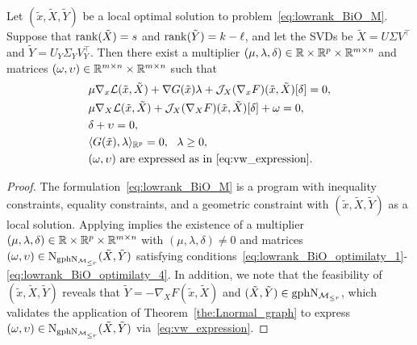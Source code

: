 \begin{proposition}\label{pro:M-stationary}
    Let $(\tilde{x},\tilde{X},\tilde{Y})$ be a local optimal solution to problem~\eqref{eq:lowrank_BiO_M}. Suppose that $\operatorname{rank}(\tilde{X})=s$ and $\operatorname{rank}(\tilde{Y})=k-\ell$, and let the SVDs be $\tilde{X}=U\varSigma V^\top$ and $\tilde{Y}=U_Y\varSigma_YV_Y^\top$. Then there exist a multiplier $(\mu,\lambda,\delta)\in\mathbb{R}\times\mathbb{R}^{p}\times\mathbb{R}^{m\times n}$ and matrices $(\omega,\upsilon)\in\mathbb{R}^{m\times n}\times\mathbb{R}^{m\times n}$ such that
    \begin{align}
        &\mu\nabla_x\mathcal{L}(\tilde{x},\tilde{X})+\nabla G(\tilde{x})\lambda+\mathcal{J}_X(\nabla_xF)(\tilde{x},\tilde{X})[\delta] = 0,  \label{eq:lowrank_BiO_optimilaty_1}
        \\
        &\mu\nabla_X\mathcal{L}(\tilde{x},\tilde{X})+\mathcal{J}_X (\nabla_X F)(\tilde{x},\tilde{X})[\delta] + \omega = 0,     \label{eq:lowrank_BiO_optimilaty_2}
        \\
        &\delta+\upsilon = 0,   \label{eq:lowrank_BiO_optimilaty_3}
        \\
        & \langle {G(\tilde{x}),\lambda} \rangle_{\mathbb{R}^p}= 0,\ \ \lambda\ge 0,   \label{eq:lowrank_BiO_optimilaty_4}
        \\
        &(\omega,\upsilon)\ \text{are expressed as in~\eqref{eq:vw_expression}}.    \nonumber
    \end{align}
\end{proposition}
\begin{proof}
    The formulation~\eqref{eq:lowrank_BiO_M} is a program with inequality constraints, equality constraints, and a geometric constraint with $(\tilde{x},\tilde{X},\tilde{Y})$ as a local solution. Applying \cite[Theorem 5.21]{mordukhovich2006variationalII} implies the existence of a multiplier $(\mu,\lambda,\delta)\in\mathbb{R}\times\mathbb{R}^{p}\times\mathbb{R}^{m\times n}$ with $(\mu,\lambda,\delta)\neq 0$ and matrices $(\omega,\upsilon)\in\mathrm{N}_{\mathrm{gph}\mathrm{N}_{\mathcal{M}_{\le r}}}(\tilde{X},\tilde{Y})$ satisfying conditions~\eqref{eq:lowrank_BiO_optimilaty_1}-\eqref{eq:lowrank_BiO_optimilaty_4}. In addition, we note that the feasibility of $(\tilde{x},\tilde{X},\tilde{Y})$ reveals that $\tilde{Y}=-\nabla_X F(\tilde{x},\tilde{X})$ and $(\tilde{X},\tilde{Y})\in\mathrm{gph} \mathrm{N}_{\mathcal{M}_{\le r}}$, which validates the application of Theorem~\ref{the:Lnormal_graph} to express $(\omega,\upsilon)\in\mathrm{N}_{\mathrm{gph}\mathrm{N}_{\mathcal{M}_{\le r}}}(\tilde{X},\tilde{Y})$ via~\eqref{eq:vw_expression}.
\end{proof}


